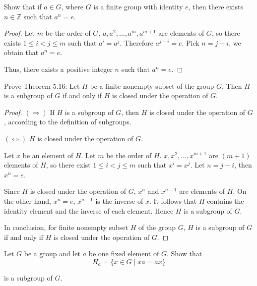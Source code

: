 \newpage
\begin{exercise}
    Show that if $a\in G$, where $G$ is a finite group with identity $e$, then there exists $n\in\mathbb{Z}$ such that $a^{n} = e$.
\end{exercise}

\begin{proof}
    Let $m$ be the order of $G$. $a, a^{2}, \ldots, a^{m}, a^{m+1}$ are elements of $G$, so there exists $1\leq i < j \leq m$ such that $a^{i} = a^{j}$. Therefore $a^{j-i} = e$. Pick $n = j - i$, we obtain that $a^{n} = e$.

    Thus, there exists a positive integer $n$ such that $a^{n} = e$.
\end{proof}

\newpage
\begin{exercise}
    Prove Theorem 5.16: Let $H$ be a finite nonempty subset of the group $G$. Then $H$ is a subgroup of $G$ if and only if $H$ is closed under the operation of $G$.
\end{exercise}

\begin{proof}
    $(\Rightarrow)$ If $H$ is a subgroup of $G$, then $H$ is closed under the operation of $G$, according to the definition of subgroups.

    $(\Leftrightarrow)$ $H$ is closed under the operation of $G$.

    Let $x$ be an element of $H$. Let $m$ be the order of $H$. $x, x^{2}, \ldots, x^{m+1}$ are $(m+1)$ elements of $H$, so there exist $1\leq i < j \leq m$ such that $x^{i} = x^{j}$. Let $n = j - i$, then $x^{n} = e$.

    Since $H$ is closed under the operation of $G$, $x^{n}$ and $x^{n-1}$ are elements of $H$. On the other hand, $x^{n} = e$, $x^{n-1}$ is the inverse of $x$. It follows that $H$ contains the identity element and the inverse of each element. Hence $H$ is a subgroup of $G$.

    In conclusion, for finite nonempty subset $H$ of the group $G$, $H$ is a subgroup of $G$ if and only if $H$ is closed under the operation of $G$.
\end{proof}

\newpage
\begin{exercise}
    Let $G$ be a group and let $a$ be one fixed element of $G$. Show that
    \[
        H_{a} = \{ x\in G \mid xa = ax \}
    \]

    is a subgroup of $G$.
\end{exercise}

